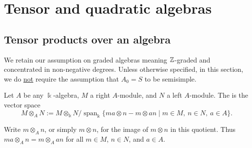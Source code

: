 \section{Tensor and quadratic algebras}


\subsection{Tensor products over an algebra}

We retain our assumption on graded algebras meaning $\mathbb{Z}$-graded and concentrated in non-negative degrees.  Unless otherwise specified, in this section, we do 
\underline{not} require the assumption that $A_0=S$ to be semisimple.

\begin{definition}\label{def:module-tensor}
Let $A$ be any $\Bbbk$-algebra, $M$ a right $A$-module, and $N$ a left $A$-module.
The  is the vector space
\[
M\otimes_A N := M\otimes_\Bbbk N/\operatorname{span}_\Bbbk\{ma\otimes n-m\otimes an\mid m\in M,\ n\in N,\ a\in A\}.
\]
\end{definition}

Write $m\otimes_A n$, or simply $m\otimes n$, for the image of $m\otimes n$ in this quotient.
Thus $ma\otimes_A n=m\otimes_A an$ for all $m\in M$, $n\in N$, and $a\in A$.


